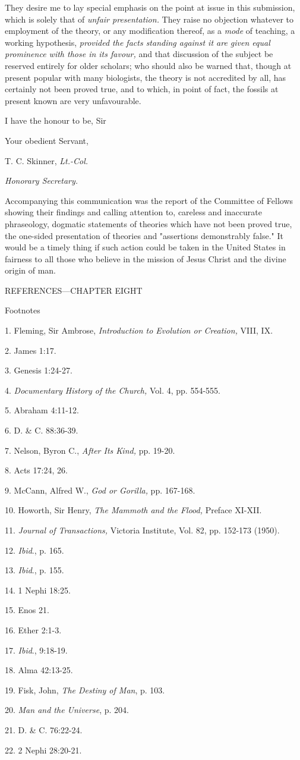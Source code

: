 They desire me to lay special emphasis on the point at issue in this submission, which is
solely that of \textit{unfair presentation.} They raise no objection whatever to employment of the
theory, or any modification thereof, as a \textit{mode} of teaching, a working hypothesis, \textit{provided
the facts standing against it are given equal prominence with those in its favour,} and that
discussion of the subject be reserved entirely for older scholars; who should also be warned
that, though at present popular with many biologists, the theory is not accredited by all, has
certainly not been proved true, and to which, in point of fact, the fossils at present known are
very unfavourable.

I have the honour to be, Sir

Your obedient Servant,

T. C. Skinner, \textit{Lt.-Col.}

\textit{Honorary Secretary.}

Accompanying this communication was the report of the Committee of Fellows showing
their findings and calling attention to, careless and inaccurate phraseology, dogmatic
statements of theories which have not been proved true, the one-sided presentation of
theories and "assertions demonstrably false." It would be a timely thing if such action could
be taken in the United States in fairness to all those who believe in the mission of Jesus
Christ and the divine origin of man.

\newpage
REFERENCES—CHAPTER EIGHT

Footnotes

1. Fleming, Sir Ambrose, \textit{Introduction to Evolution or Creation,} VIII, IX.

2. James 1:17.

3. Genesis 1:24-27.

4. \textit{Documentary History of the Church,} Vol. 4, pp. 554-555.

5. Abraham 4:11-12.

6. D. \& C. 88:36-39.

7. Nelson, Byron C., \textit{After Its Kind,} pp. 19-20.

8. Acts 17:24, 26.

9. McCann, Alfred W., \textit{God or Gorilla,} pp. 167-168.

10. Howorth, Sir Henry, \textit{The Mammoth and the Flood,} Preface XI-XII.

11. \textit{Journal of Transactions,} Victoria Institute, Vol. 82, pp. 152-173 (1950).

12. \textit{Ibid}., p. 165.

13. \textit{Ibid}., p. 155.

14. 1 Nephi 18:25.

15. Enos 21.

16. Ether 2:1-3.

17. \textit{Ibid}., 9:18-19.

18. Alma 42:13-25.

19. Fisk, John, \textit{The Destiny of Man}, p. 103.

20. \textit{Man and the Universe}, p. 204.

21. D. \& C. 76:22-24.

22. 2 Nephi 28:20-21.

